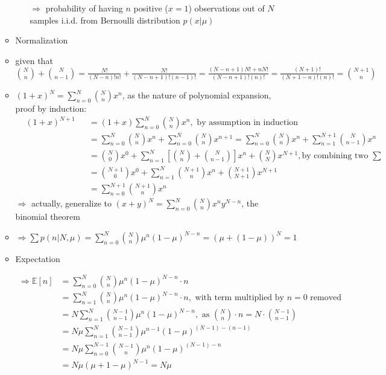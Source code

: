 \begin{itemize}
\begin{itemize}
\begin{itemize}
		$\Rightarrow$ probability of having $n$ positive ($x=1$) observations out of $N$ samples i.i.d. from Bernoulli distribution $p(x|\mu)$
		\end{itemize}
	\item Normalization
		\item given that $\binom{N}{n} + \binom{N}{n-1} = \frac{N!}{(N-n)!n!} + \frac{N!}{(N-n+1)!(n-1)!} = \frac{(N-n+1)N! + nN!}{(N-n+1)!(n)!} = \frac{(N+1)!}{(N+1-n)!(n)!} = \binom{N+1}{n}$
		\item $(1+x)^{N} = \sum_{n=0}^{N} \binom{N}{n}x^n$, as the nature of polynomial expansion, proof by induction: \\
		$\begin{alignedat}{2} & (1+x)^{N+1} &&= (1+x)\sum_{n=0}^N\binom{N}{n}x^n, \text{ by assumption in induction} \\
		& &&= \sum_{n=0}^N\binom{N}{n}x^n + \sum_{n=0}^N\binom{N}{n}x^{n+1} = \sum_{n=0}^N\binom{N}{n}x^n + \sum_{n=1}^{N+1}\binom{N}{n-1}x^{n} \\
		& &&= \binom{N}{0}x^0 + \sum_{n=1}^N [ \binom{N}{n} + \binom{N}{n-1} ] x^n + \binom{N}{N} x^{N+1}, \text{by combining two } \sum \\
		& &&= \binom{N+1}{0}x^0 + \sum_{n=1}^N \binom{N+1}{n} x^n + \binom{N+1}{N+1} x^{N+1} \\
		& &&= \sum_{n=0}^{N+1} \binom{N+1}{n} x^n
		\end{alignedat}$ \\
		$\Rightarrow$ actually, generalize to $(x + y)^N = \sum_{n=0}^N \binom{N}{n} x^n y^{N-n}$, the binomial theorem
		\item $\Rightarrow \sum p(n|N,\mu) = \sum_{n=0}^N \binom{N}{n}\mu^n(1-\mu)^{N-n} = (\mu+ (1-\mu))^N = 1$
	\item Expectation
		\begin{itemize}
		\Item \begin{align*} \Rightarrow \mathbb E[n] &= \sum_{n=0}^N \binom{N}{n}\mu^n(1-\mu)^{N-n}\cdot n \\
		&= \sum_{n=1}^N\binom{N}{n} \mu^n(1-\mu)^{N-n} \cdot n, \text{ with term multiplied by } n=0 \text{ removed} \\
		&= N \sum_{n=1}^N\binom{N-1}{n-1} \mu^n(1-\mu)^{N-n}, \text{ as } \binom{N}{n}\cdot n = N\cdot\binom{N-1}{n-1} \\
		&= N\mu \sum_{n=1}^{N}\binom{N-1}{n-1} \mu^{n-1}(1-\mu)^{(N-1)-(n-1)} \\
		&= N\mu \sum_{n=0}^{N-1}\binom{N-1}{n} \mu^{n}(1-\mu)^{(N-1)-n} \\
		&= N\mu (\mu + 1-\mu)^{N-1} = N\mu\end{align*}

\end{itemize}
\end{itemize}
\end{itemize}
